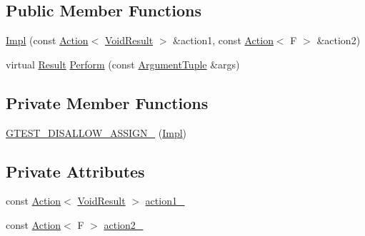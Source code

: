 \subsection*{Public Member Functions}
\begin{DoxyCompactItemize}
\item 
\mbox{\hyperlink{classtesting_1_1internal_1_1_do_both_action_1_1_impl_a0808e190e7b2545bfd5bc0cc9bf4f4a4}{Impl}} (const \mbox{\hyperlink{classtesting_1_1_action}{Action}}$<$ \mbox{\hyperlink{classtesting_1_1internal_1_1_do_both_action_1_1_impl_a83909f0d1addcd1207ff45b128f33802}{Void\+Result}} $>$ \&action1, const \mbox{\hyperlink{classtesting_1_1_action}{Action}}$<$ F $>$ \&action2)
\item 
virtual \mbox{\hyperlink{classtesting_1_1_action_interface_a7477de2fe3e4e01c59db698203acaee7}{Result}} \mbox{\hyperlink{classtesting_1_1internal_1_1_do_both_action_1_1_impl_aa8f102e1918e64266ddb9b00db2c4b5e}{Perform}} (const \mbox{\hyperlink{classtesting_1_1_action_interface_af72720d864da4d606629e83edc003511}{Argument\+Tuple}} \&args)
\end{DoxyCompactItemize}
\subsection*{Private Member Functions}
\begin{DoxyCompactItemize}
\item 
\mbox{\hyperlink{classtesting_1_1internal_1_1_do_both_action_1_1_impl_a2c00537668b40a1e05f131c3d8e4e88b}{G\+T\+E\+S\+T\+\_\+\+D\+I\+S\+A\+L\+L\+O\+W\+\_\+\+A\+S\+S\+I\+G\+N\+\_\+}} (\mbox{\hyperlink{classtesting_1_1internal_1_1_do_both_action_1_1_impl}{Impl}})
\end{DoxyCompactItemize}
\subsection*{Private Attributes}
\begin{DoxyCompactItemize}
\item 
const \mbox{\hyperlink{classtesting_1_1_action}{Action}}$<$ \mbox{\hyperlink{classtesting_1_1internal_1_1_do_both_action_1_1_impl_a83909f0d1addcd1207ff45b128f33802}{Void\+Result}} $>$ \mbox{\hyperlink{classtesting_1_1internal_1_1_do_both_action_1_1_impl_af54fe7ce6f362c7ecae828804d18039a}{action1\+\_\+}}
\item 
const \mbox{\hyperlink{classtesting_1_1_action}{Action}}$<$ F $>$ \mbox{\hyperlink{classtesting_1_1internal_1_1_do_both_action_1_1_impl_af1f725e8d028c532c07ee606df35dc44}{action2\+\_\+}}
\end{DoxyCompactItemize}


